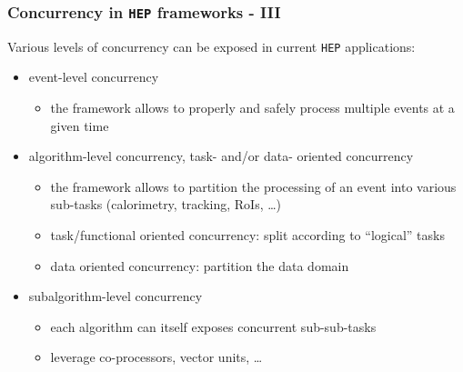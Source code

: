 \documentclass[10pt]{beamer}
\begin{document}
\begin{frame}[fragile]
\frametitle{Concurrency in \verb~HEP~ frameworks - III}
\label{sec-1-5}


Various levels of concurrency can be exposed in current \verb~HEP~ applications:

\begin{itemize}
\item \alert{event-level} concurrency
\begin{itemize}
\item the framework allows to properly and safely process multiple events
    at a given time
\end{itemize}
\item \alert{algorithm-level} concurrency, \alert{task-} and/or \alert{data-} oriented concurrency
\begin{itemize}
\item the framework allows to partition the processing of an event into various
    sub-tasks (calorimetry, tracking, RoIs, \ldots{})
\item \alert{task/functional} oriented concurrency: split according to ``logical'' tasks
\item \alert{data} oriented concurrency: partition the data domain
\end{itemize}
\item \alert{subalgorithm-level} concurrency
\begin{itemize}
\item each algorithm can itself exposes concurrent sub-sub-tasks
\item leverage co-processors, vector units, \ldots{}
\end{itemize}
\end{itemize}
\end{frame}
\end{document}
